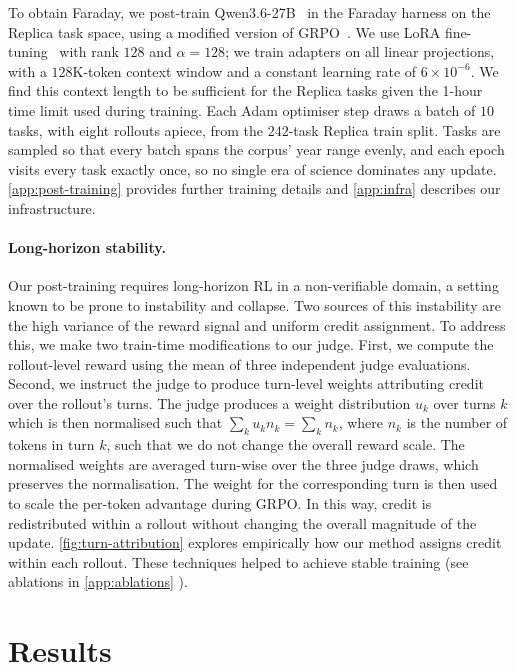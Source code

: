 \documentclass[garamond,a4paper]{inherent}
\renewcommand{\sectionautorefname}{Section}%
\renewcommand{\subsectionautorefname}{Section}%
\renewcommand{\subsubsectionautorefname}{Section}%
\DeclareRobustCommand{\appref}[1]{%
  \begingroup
  \renewcommand{\sectionautorefname}{Appendix}%
  \renewcommand{\subsectionautorefname}{Appendix}%
  \renewcommand{\subsubsectionautorefname}{Appendix}%
  \autoref{#1}%
  \endgroup}
\newcommand{\faradayname}{Faraday\xspace}
\newcommand{\replicaname}{Replica\xspace}
\begin{document}
To obtain \faradayname, we post-train Qwen3.6-27B~\citep{qwen2026qwen36} in the Faraday harness on the \replicaname task space, using a modified version of GRPO~\citep{shao2024deepseekmath}.
We use LoRA fine-tuning~\citep{hu2022lora} with rank $128$ and $\alpha=128$; we train adapters on all linear projections, with a $128$K-token context window and a constant learning rate of $6 \times 10^{-6}$. We find this context length to be sufficient for the \replicaname tasks given the 1-hour time limit used during training.
Each Adam \citep{kingma2014adam} optimiser step draws a batch of $10$ tasks, with eight rollouts apiece, from the $242$-task \replicaname train split. Tasks are sampled so that every batch spans the corpus' year range evenly, and each epoch visits every task exactly once, so no single era of science dominates any update. \appref{app:post-training} provides further training details and \appref{app:infra} describes our infrastructure.


\paragraph{Long-horizon stability.}
Our post-training requires long-horizon RL in a non-verifiable domain, a setting known to be prone to instability and collapse.
Two sources of this instability are the high variance of the reward signal and uniform credit assignment.
To address this, we make two train-time modifications to our judge.
First, we compute the rollout-level reward using the mean of three independent judge evaluations.
Second, we instruct the judge to produce turn-level weights attributing credit over the rollout's turns.
The judge produces a weight distribution $u_k$ over turns $k$ which is then normalised such that $\sum_k u_k n_k = \sum_k n_k$, where $n_k$ is the number of tokens in turn $k$, such that we do not change the overall reward scale. The normalised weights are averaged turn-wise over the three judge draws, which preserves the normalisation. The weight for the corresponding turn is then used to scale the per-token advantage during GRPO. In this way, credit is redistributed within a rollout without changing the overall magnitude of the update. \appref{fig:turn-attribution} explores empirically how our method assigns credit within each rollout. These techniques helped to achieve stable training (see ablations in \appref{app:ablations}).


\FloatBarrier
\section{Results}
\end{document}
